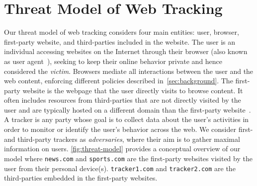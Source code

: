 \section{Threat Model of Web Tracking}
\label{sec:threat-model}


Our threat model of web tracking considers four main entities: user, browser, first-party website, and third-parties included in the website. 
%
The user is an individual accessing websites on the Internet through their browser (also known as user agent~\cite{mdnUserAgentMDN2025}), seeking to keep their online behavior private and hence considered the \textit{victim}. %
%
Browsers mediate all interactions between the user and the web content, enforcing different policies described in~\autoref{sec:background}. %
%
The first-party website is the webpage that the user directly visits to browse content. 
%
It often includes resources from third-parties that are not directly visited by the user and are typically hosted on a different domain than the first-party website~\cite{mdnDomainMDNWeb2024}.
%
A tracker is any party whose goal is to collect data about the user’s activities in order to monitor or identify the user’s behavior across the web. %
%
We consider first- and third-party trackers as \textit{adversaries}, where their aim is to gather maximal information on users. %
%
\autoref{fig:threat-model} provides a conceptual overview of our model where \texttt{news.com} and \texttt{sports.com} are the first-party websites visited by the user from their personal device(s). 
%
\texttt{tracker1.com} and \texttt{tracker2.com} are the third-parties embedded in the first-party websites.



